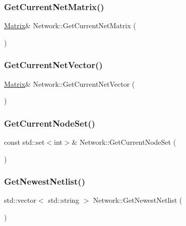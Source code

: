 \subsubsection{\texorpdfstring{Get\+Current\+Net\+Matrix()}{GetCurrentNetMatrix()}}
{\footnotesize\ttfamily \hyperlink{classMatrix}{Matrix}\& Network\+::\+Get\+Current\+Net\+Matrix (\begin{DoxyParamCaption}{ }\end{DoxyParamCaption})\hspace{0.3cm}{\ttfamily [inline]}}

\mbox{\label{classNetwork_a14a99e68dac334d31c127032b24cee0c}} 
\subsubsection{\texorpdfstring{Get\+Current\+Net\+Vector()}{GetCurrentNetVector()}}
{\footnotesize\ttfamily \hyperlink{classMatrix}{Matrix}\& Network\+::\+Get\+Current\+Net\+Vector (\begin{DoxyParamCaption}{ }\end{DoxyParamCaption})\hspace{0.3cm}{\ttfamily [inline]}}

\mbox{\label{classNetwork_a355e3ef39f7178851cb230846d616cef}} 
\subsubsection{\texorpdfstring{Get\+Current\+Node\+Set()}{GetCurrentNodeSet()}}
{\footnotesize\ttfamily const std\+::set$<$int$>$\& Network\+::\+Get\+Current\+Node\+Set (\begin{DoxyParamCaption}{ }\end{DoxyParamCaption})\hspace{0.3cm}{\ttfamily [inline]}}

\mbox{\label{classNetwork_addae3802a581406208810ce430a045f9}} 
\subsubsection{\texorpdfstring{Get\+Newest\+Netlist()}{GetNewestNetlist()}}
{\footnotesize\ttfamily std\+::vector$<$ std\+::string $>$ Network\+::\+Get\+Newest\+Netlist (\begin{DoxyParamCaption}{ }\end{DoxyParamCaption})}

